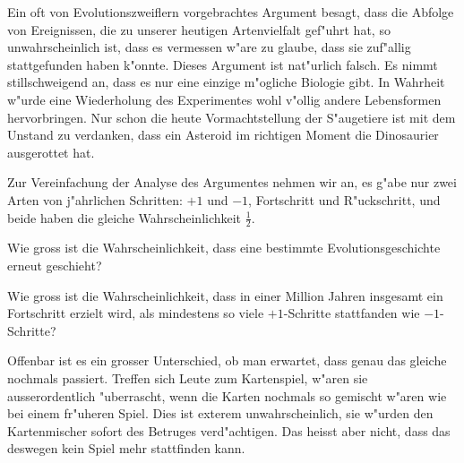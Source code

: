 Ein oft von Evolutionszweiflern vorgebrachtes Argument besagt, dass
die Abfolge von Ereignissen, die zu unserer heutigen Artenvielfalt
gef"uhrt hat, so unwahrscheinlich ist, dass es vermessen w"are zu
glaube, dass sie zuf"allig stattgefunden haben k"onnte. Dieses Argument
ist nat"urlich falsch. Es nimmt stillschweigend an, dass es nur eine
einzige m"ogliche Biologie gibt. In Wahrheit w"urde eine Wiederholung des
Experimentes wohl v"ollig andere Lebensformen hervorbringen. Nur schon
die heute Vormachtstellung der S"augetiere ist mit dem Unstand zu
verdanken, dass ein Asteroid im richtigen Moment die Dinosaurier
ausgerottet hat.

Zur Vereinfachung der Analyse des Argumentes nehmen wir an, es g"abe nur
zwei Arten von j"ahrlichen Schritten: $+1$ und $-1$, Fortschritt und
R"uckschritt,
und beide haben die gleiche Wahrscheinlichkeit $\frac12$.
\begin{teilaufgaben}
\item
Wie gross ist
die Wahrscheinlichkeit, dass eine bestimmte Evolutionsgeschichte erneut
geschieht?
\item Wie gross ist die Wahrscheinlichkeit, dass in einer Million
Jahren insgesamt ein Fortschritt erzielt wird, als mindestens so viele $+1$-Schritte stattfanden wie $-1$-Schritte?
\end{teilaufgaben}

Offenbar ist es ein grosser Unterschied, ob man erwartet, dass genau
das gleiche nochmals passiert. Treffen sich Leute zum Kartenspiel,
w"aren sie ausserordentlich "uberrascht, wenn die Karten nochmals so
gemischt w"aren wie bei einem fr"uheren Spiel. Dies ist exterem
unwahrscheinlich, sie w"urden den Kartenmischer sofort des Betruges
verd"achtigen. Das heisst aber nicht, dass das deswegen kein Spiel mehr
stattfinden kann.

